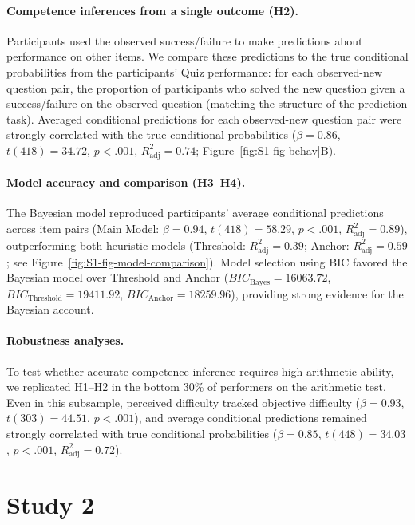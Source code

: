 \documentclass[10pt,letterpaper]{article}
\begin{document}
\paragraph{Competence inferences from a single outcome (H2).}
Participants used the observed success/failure to make predictions about performance on other items. We compare these predictions to the true conditional probabilities from the participants' Quiz performance: for each observed-new question pair, the proportion of participants who solved the new question given a success/failure on the observed question (matching the structure of the prediction task). Averaged conditional predictions for each observed-new question pair were strongly correlated with the true conditional probabilities ($\beta = 0.86$, $t(418)=34.72$, $p<.001$, $R^2_{\text{adj}}=0.74$; Figure~\ref{fig:S1-fig-behav}B).

\paragraph{Model accuracy and comparison (H3--H4).}
The Bayesian model reproduced participants’ average conditional predictions across item pairs (Main Model: $\beta = 0.94$, $t(418)=58.29$, $p<.001$, $R^2_{\text{adj}}=0.89$), outperforming both heuristic models (Threshold: $R^2_{\text{adj}}=0.39$; Anchor: $R^2_{\text{adj}}=0.59$; see Figure~\ref{fig:S1-fig-model-comparison}). Model selection using BIC favored the Bayesian model over Threshold and Anchor ($BIC_{\text{Bayes}}=16063.72$, $BIC_{\text{Threshold}}=19411.92$, $BIC_{\text{Anchor}}=18259.96$), providing strong evidence for the Bayesian account. 

\paragraph{Robustness analyses.}
To test whether accurate competence inference requires high arithmetic ability, we replicated H1--H2 in the bottom 30\% of performers on the arithmetic test. Even in this subsample, perceived difficulty tracked objective difficulty ($\beta = 0.93$, $t(303)=44.51$, $p<.001$), and average conditional predictions remained strongly correlated with true conditional probabilities ($\beta = 0.85$, $t(448)=34.03$, $p<.001$, $R^2_{\text{adj}}=0.72$).

\section{Study 2}\label{study-2}
\end{document}
